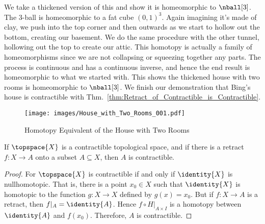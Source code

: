 \documentclass{book}                                                           %
\begin{document}
                We take a thickened version of this and show it is homeomorphic
                to $\nball[3]$. The 3-ball is homeomorphic to a fat cube
                $(0,1)^{3}$. Again imagining it's made of clay, we push
                into the top corner and then outwards as we start to hollow out
                the bottom, creating our basement. We do the same procedure with
                the other tunnel, hollowing out the top to create our attic.
                This homotopy is actually a family of homeomorphisms since we
                are not collapsing or squeezing together any parts. The process
                is continuous and has a continuous inverse, and hence the end
                result is homeomorphic to what we started with. This shows the
                thickened house with two rooms is homeomorphic to $\nball[3]$.
                We finish our demonstration that Bing's house is contractible
                with Thm.~\ref{thm:Retract_of_Contractible_is_Contractible}.
                \begin{figure}
                    \centering
                    \captionsetup{type=figure}
                    \texttt{[image: images/House\_with\_Two\_Rooms\_001.pdf]}
                    \caption{Homotopy Equivalent of the House with Two Rooms}
                    \label{fig:House_with_Two_Rooms_001}
                \end{figure}
                \begin{theorem}
                    \label{thm:Retract_of_Contractible_is_Contractible}%
                    If $\topspace{X}$ is a contractible topological space, and
                    if there is a retract $f:X\rightarrow{A}$ onto a subset
                    $A\subseteq{X}$, then $A$ is contractible.
                \end{theorem}
                \begin{proof}
                    For $\topspace{X}$ is contractible if and only if
                    $\identity{X}$ is nullhomotopic. That is, there is a point
                    $x_{0}\in{X}$ such that $\identity{X}$ is homotopic to the
                    function $g:X\rightarrow{X}$ defined by $g(x)=x_{0}$. But if
                    $f:X\rightarrow{A}$ is a retract, then
                    $f|_{A}=\identity{A}$. Hence $f\circ{H}|_{A\times{I}}$ is a
                    homotopy between $\identity{A}$ and $f(x_{0})$. Therefore,
                    $A$ is contractible.
                \end{proof}
\end{document}
